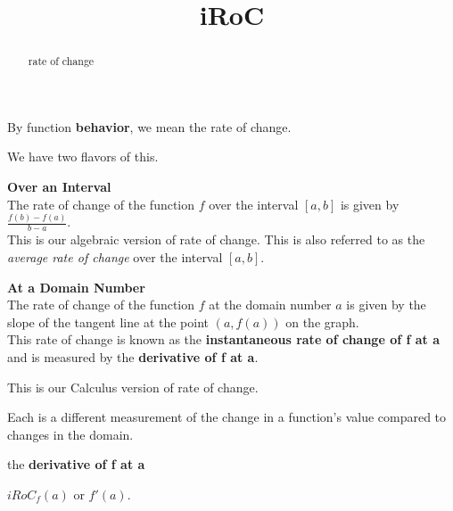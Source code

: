 \documentclass{ximera}
\title{iRoC}
\begin{document}
\begin{abstract}
rate of change
\end{abstract}
\maketitle




By function \textbf{behavior}, we mean the rate of change.


We have two flavors of this.




\begin{fact} \textbf{\textcolor{blue!55!black}{Over an Interval}}    \\


The rate of change of the function $f$ over the interval $[a, b]$ is given by $\frac{f(b) - f(a)}{b - a}$. \\


This is our algebraic version of rate of change. This is also referred to as the \textit{average rate of change} over the interval $[a, b]$.


\end{fact}






\begin{fact} \textbf{\textcolor{blue!55!black}{At a Domain Number}}   \\


The rate of change of the function $f$ at the domain number $a$ is given by the slope of the tangent line at the point $(a, f(a))$ on the graph. \\


This rate of change is known as the \textbf{\textcolor{purple!85!blue}{instantaneous rate of change of f at a}} and is measured by the \textbf{\textcolor{blue!55!black}{derivative of f at a}}. 


This is our Calculus version of rate of change.


\end{fact}


Each is a different measurement of the change in a function's value compared to changes in the domain. \\




\begin{notation} the \textbf{\textcolor{blue!55!black}{derivative of f at a}}


\textbf{\textcolor{blue!55!black}{$iRoC_f(a)$}} or \textbf{\textcolor{blue!55!black}{$f'(a)$}}.

\end{notation}
\end{document}
